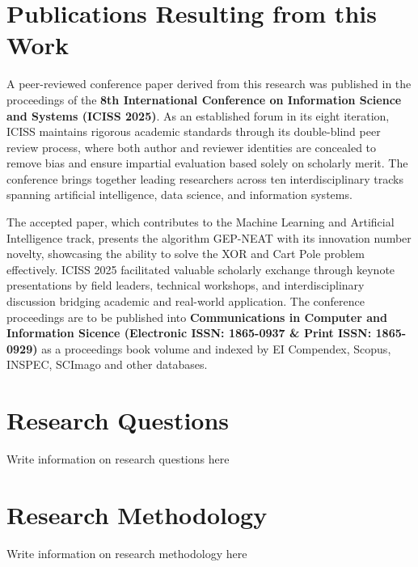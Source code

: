 \section{Publications Resulting from this Work}
A peer-reviewed conference paper derived from this research was published in the proceedings of the \textbf{8th International Conference on Information Science and Systems (ICISS 2025)}. As an established forum in its eight iteration, ICISS maintains rigorous academic standards through its double-blind peer review process, where both author and reviewer identities are concealed to remove bias and ensure impartial evaluation based solely on scholarly merit. The conference brings together leading researchers across ten interdisciplinary tracks spanning artificial intelligence, data science, and information systems. \bigskip

\noindent The accepted paper, which contributes to the Machine Learning and Artificial Intelligence track, presents the algorithm GEP-NEAT with its innovation number novelty, showcasing the ability to solve the XOR and Cart Pole problem effectively. ICISS 2025 facilitated valuable scholarly exchange through keynote presentations by field leaders, technical workshops, and interdisciplinary discussion bridging academic and real-world application. The conference proceedings are to be published into \textbf{Communications in Computer and Information Sicence (Electronic ISSN: 1865-0937 \& Print ISSN: 1865-0929)} as a proceedings book volume and indexed by EI Compendex, Scopus, INSPEC, SCImago and other databases.

\section{Research Questions}
Write information on research questions here

\section{Research Methodology}
Write information on research methodology here
